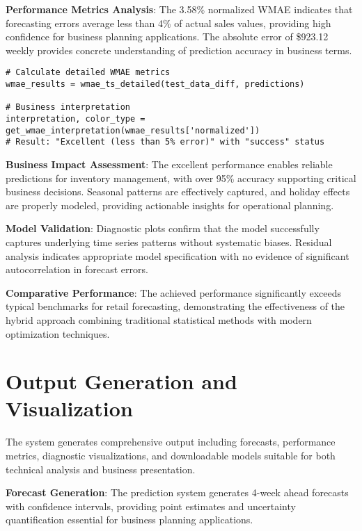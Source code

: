 \textbf{Performance Metrics Analysis}: The 3.58\% normalized WMAE indicates that forecasting errors average less than 4\% of actual sales values, providing high confidence for business planning applications. The absolute error of \$923.12 weekly provides concrete understanding of prediction accuracy in business terms.

\begin{lstlisting}[style=bashstyle, caption={Performance Evaluation and Interpretation}]
# Calculate detailed WMAE metrics
wmae_results = wmae_ts_detailed(test_data_diff, predictions)

# Business interpretation
interpretation, color_type = get_wmae_interpretation(wmae_results['normalized'])
# Result: "Excellent (less than 5% error)" with "success" status
\end{lstlisting}

\textbf{Business Impact Assessment}: The excellent performance enables reliable predictions for inventory management, with over 95\% accuracy supporting critical business decisions. Seasonal patterns are effectively captured, and holiday effects are properly modeled, providing actionable insights for operational planning.

\textbf{Model Validation}: Diagnostic plots confirm that the model successfully captures underlying time series patterns without systematic biases. Residual analysis indicates appropriate model specification with no evidence of significant autocorrelation in forecast errors.

\textbf{Comparative Performance}: The achieved performance significantly exceeds typical benchmarks for retail forecasting, demonstrating the effectiveness of the hybrid approach combining traditional statistical methods with modern optimization techniques.

\section{Output Generation and Visualization}

The system generates comprehensive output including forecasts, performance metrics, diagnostic visualizations, and downloadable models suitable for both technical analysis and business presentation.

\textbf{Forecast Generation}: The prediction system generates 4-week ahead forecasts with confidence intervals, providing point estimates and uncertainty quantification essential for business planning applications.

